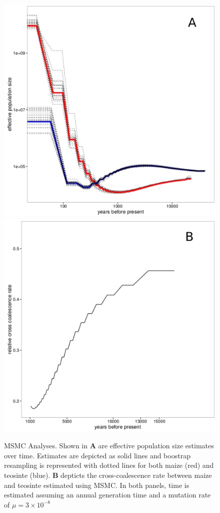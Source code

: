 \begin{figure}
  \includegraphics[width=.5\textwidth]{FigsAndFiles/TIL_BKN_bootstrapping_msmc2_labeled.pdf}
  \includegraphics[width=.5\textwidth]{FigsAndFiles/relativeCrossCoalescenceRate_labeled.pdf}
\caption{MSMC Analyses. Shown in \textbf{A} are effective population size estimates over time. Estimates are depicted as solid lines and boostrap resampling is represented with dotted lines for both maize (red) and teosinte (blue). \textbf{B} depticts the cross-coalescence rate between maize and teosinte estimated using MSMC. In both panels, time is estimated assuming an annual generation time and a mutation rate of $\mu=3\times 10^{-8}$ \label{sFig:msmc}}
\end{figure}
\clearpage


